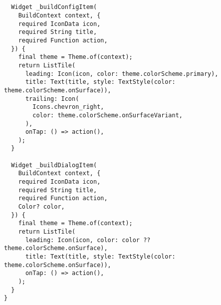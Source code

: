 \begin{verbatim}
 

  Widget _buildConfigItem(
    BuildContext context, {
    required IconData icon,
    required String title,
    required Function action,
  }) {
    final theme = Theme.of(context);
    return ListTile(
      leading: Icon(icon, color: theme.colorScheme.primary),
      title: Text(title, style: TextStyle(color: theme.colorScheme.onSurface)),
      trailing: Icon(
        Icons.chevron_right,
        color: theme.colorScheme.onSurfaceVariant,
      ),
      onTap: () => action(),
    );
  }

  Widget _buildDialogItem(
    BuildContext context, {
    required IconData icon,
    required String title,
    required Function action,
    Color? color,
  }) {
    final theme = Theme.of(context);
    return ListTile(
      leading: Icon(icon, color: color ?? theme.colorScheme.onSurface),
      title: Text(title, style: TextStyle(color: theme.colorScheme.onSurface)),
      onTap: () => action(),
    );
  }
}

\end{verbatim}